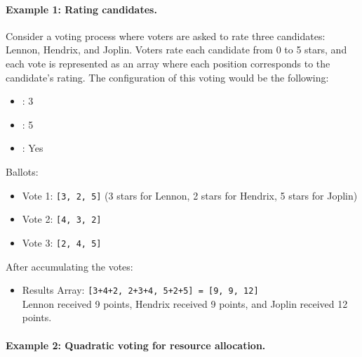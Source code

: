 
\paragraph{Example 1: Rating candidates.}


Consider a voting process where voters are asked to rate three candidates: Lennon, Hendrix, and Joplin. Voters rate each candidate from 0 to 5 stars, and each vote is represented as an array where each position corresponds to the candidate’s rating. The configuration of this voting would be the following:

\begin{itemize}
	\item \maxcount: 3
	\item \maxvalue: 5
	\item \uniquevalues: Yes
\end{itemize}

Ballots:

\begin{itemize}
	\item Vote 1: \texttt{[3, 2, 5]} (3 stars for Lennon, 2 stars for Hendrix, 5 stars for Joplin)
	\item Vote 2: \texttt{[4, 3, 2]}
	\item Vote 3: \texttt{[2, 4, 5]}
\end{itemize}


After accumulating the votes:

\begin{itemize}
	\item Results Array: \texttt{[3+4+2, 2+3+4, 5+2+5] = [9, 9, 12]}\\
	Lennon received 9 points, Hendrix received 9 points, and Joplin received 12 points.
\end{itemize}


\paragraph{Example 2: Quadratic voting for resource allocation.} 

